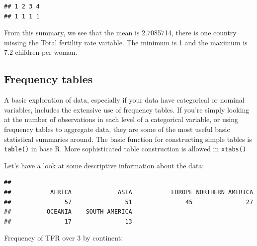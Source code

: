 \documentclass[
]{book}
\newenvironment{Shaded}{\begin{snugshade}}{\end{snugshade}}
\newcommand{\CommentTok}[1]{\textcolor[rgb]{0.56,0.35,0.01}{\textit{#1}}}
\newcommand{\DecValTok}[1]{\textcolor[rgb]{0.00,0.00,0.81}{#1}}
\newcommand{\FunctionTok}[1]{\textcolor[rgb]{0.00,0.00,0.00}{#1}}
\newcommand{\NormalTok}[1]{#1}
\newcommand{\SpecialCharTok}[1]{\textcolor[rgb]{0.00,0.00,0.00}{#1}}
\begin{document}
\begin{verbatim}
## 1 2 3 4 
## 1 1 1 1
\end{verbatim}

From this summary, we see that the mean is
2.7085714, there is one country missing the Total
fertility rate variable. The minimum is 1 and the maximum is 7.2
children per woman.

\hypertarget{frequency-tables}{%
\subsection{Frequency tables}\label{frequency-tables}}

A basic exploration of data, especially if your data have categorical or
nominal variables, includes the extensive use of frequency tables. If
you're simply looking at the number of observations in each level of a
categorical variable, or using frequency tables to aggregate data, they
are some of the most useful basic statistical summaries around. The
basic function for constructing simple tables is \texttt{table()} in base R.
More sophisticated table construction is allowed in \texttt{xtabs()}

Let's have a look at some descriptive information about the data:

\begin{Shaded}
\end{Shaded}

\begin{verbatim}
## 
##           AFRICA             ASIA           EUROPE NORTHERN AMERICA 
##               57               51               45               27 
##          OCEANIA    SOUTH AMERICA 
##               17               13
\end{verbatim}

Frequency of TFR over 3 by continent:

\begin{Shaded}
\end{Shaded}
\end{document}
